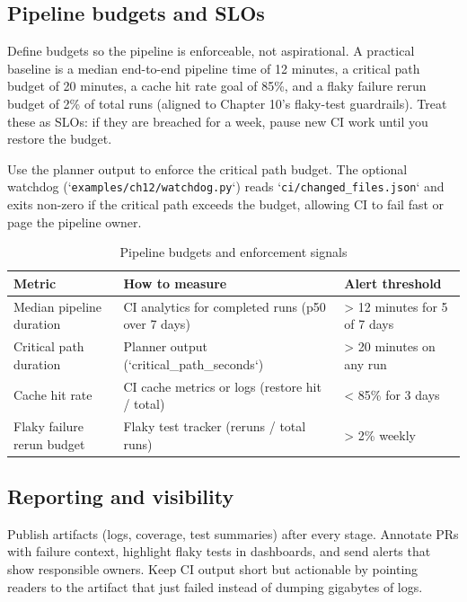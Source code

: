 \subsection{Pipeline budgets and SLOs}
Define budgets so the pipeline is enforceable, not aspirational. A practical baseline is a median end-to-end pipeline time of 12 minutes, a critical path budget of 20 minutes, a cache hit rate goal of 85\%, and a flaky failure rerun budget of 2\% of total runs (aligned to Chapter 10's flaky-test guardrails). Treat these as SLOs: if they are breached for a week, pause new CI work until you restore the budget.

Use the planner output to enforce the critical path budget. The optional watchdog (`\texttt{examples/ch12/watchdog.py}`) reads `\texttt{ci/changed\_files.json}` and exits non-zero if the critical path exceeds the budget, allowing CI to fail fast or page the pipeline owner.

\begin{table}[h]
\centering
\caption{Pipeline budgets and enforcement signals}
\label{tab:ci-budgets}
\begin{tabular}{p{4cm}p{5cm}p{4cm}}
\toprule
Metric & How to measure & Alert threshold \\
\midrule
Median pipeline duration & CI analytics for completed runs (p50 over 7 days) & > 12 minutes for 5 of 7 days \\
Critical path duration & Planner output (`critical\_path\_seconds`) & > 20 minutes on any run \\
Cache hit rate & CI cache metrics or logs (restore hit / total) & < 85\% for 3 days \\
Flaky failure rerun budget & Flaky test tracker (reruns / total runs) & > 2\% weekly \\
\bottomrule
\end{tabular}
\end{table}

\subsection{Reporting and visibility}
Publish artifacts (logs, coverage, test summaries) after every stage. Annotate PRs with failure context, highlight flaky tests in dashboards, and send alerts that show responsible owners. Keep CI output short but actionable by pointing readers to the artifact that just failed instead of dumping gigabytes of logs.

